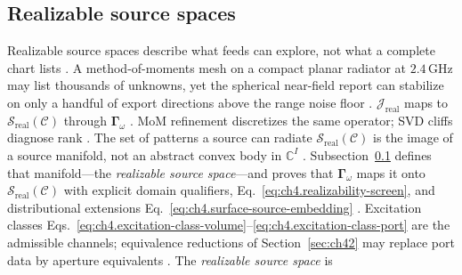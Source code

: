 \subsection{Realizable source spaces}
\label{sec:ch414}
Realizable source spaces describe what feeds can explore, not what a complete chart lists \cite{harrington2001}.
A method-of-moments mesh on a compact planar radiator at $2.4\,\mathrm{GHz}$ may list thousands of unknowns, yet the spherical near-field report can stabilize on only a handful of export directions above the range noise floor \cite{hansen1988}.
$\mathcal{J}_{\mathrm{real}}$ maps to $\mathcal{S}_{\mathrm{real}}(\mathcal{C})$ through $\boldsymbol{\Gamma}_\omega$ \cite{devaney2004}. MoM refinement discretizes the same operator; SVD cliffs diagnose rank \cite{hansen1988}.
\medskip
The set of patterns a source can radiate \(\mathcal{S}_{\mathrm{real}}(\mathcal{C})\) is the image of a source manifold, not an
abstract convex body in \(\mathbb{C}^{I}\) \cite{devaney2004}. Subsection~\ref{sec:ch414} defines that
manifold---the \emph{realizable source space}---and proves that \(\boldsymbol{\Gamma}_\omega\) maps it onto
\(\mathcal{S}_{\mathrm{real}}(\mathcal{C})\) with explicit domain qualifiers, Eq.~\eqref{eq:ch4.realizability-screen}, and distributional extensions
Eq.~\eqref{eq:ch4.surface-source-embedding} \cite{stratton1941}. Excitation classes
Eqs.~\eqref{eq:ch4.excitation-class-volume}--\eqref{eq:ch4.excitation-class-port} are the admissible
channels; equivalence reductions of Section~\ref{sec:ch42} may replace port data by aperture equivalents
\cite{collin2001}.
\label{def:ch4.realizable-source-space}
The \emph{realizable source space} is
